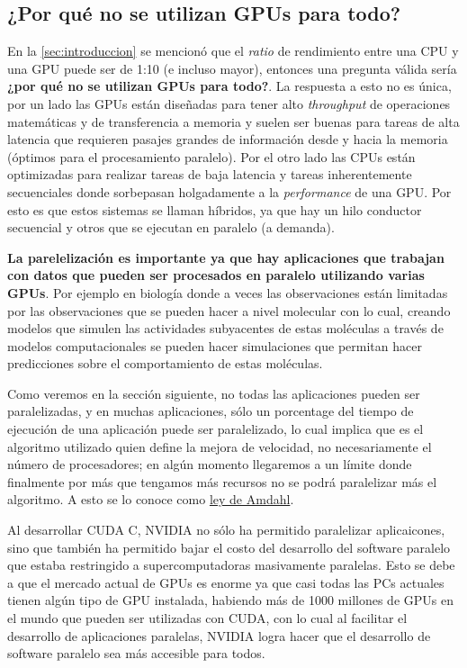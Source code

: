\subsection{¿Por qué no se utilizan GPUs para todo?}

En la \ref{sec:introduccion} se mencionó que el \textit{ratio} de rendimiento entre una CPU y una GPU puede ser de 1:10
(e incluso mayor), entonces una pregunta válida sería \textbf{¿por qué no se utilizan GPUs para todo?}. La respuesta a
esto no es única, por un lado las GPUs están diseñadas para tener alto \textit{throughput} de operaciones matemáticas y
de transferencia a memoria y suelen ser buenas para tareas de alta latencia que requieren pasajes grandes de información
desde y hacia la memoria (óptimos para el procesamiento paralelo). Por el otro lado las CPUs están optimizadas para
realizar tareas de baja latencia y tareas inherentemente secuenciales donde sorbepasan holgadamente a la
\textit{performance} de una GPU. Por esto es que estos sistemas se llaman híbridos, ya que hay un hilo conductor
secuencial y otros que se ejecutan en paralelo (a demanda).

\textbf{La parelelización es importante ya que hay aplicaciones que trabajan con datos que pueden ser procesados en
paralelo utilizando varias GPUs}. Por ejemplo en biología donde a veces las observaciones están limitadas por las
observaciones que se pueden hacer a nivel molecular con lo cual, creando modelos que simulen las actividades subyacentes
de estas moléculas a través de modelos computacionales se pueden hacer simulaciones que permitan hacer predicciones
sobre el comportamiento de estas moléculas.

Como veremos en la sección siguiente, no todas las aplicaciones pueden ser paralelizadas, y en muchas aplicaciones, sólo
un porcentage del tiempo de ejecución de una aplicación puede ser paralelizado, lo cual implica que es el algoritmo
utilizado quien define la mejora de velocidad, no necesariamente el número de procesadores; en algún momento llegaremos
a un límite donde finalmente por más que tengamos más recursos no se podrá paralelizar más el algoritmo. A esto se lo
conoce como \href{https://es.wikipedia.org/wiki/Ley_de_Amdahl}{ley de Amdahl}.

Al desarrollar CUDA C, NVIDIA no sólo ha permitido paralelizar aplicaicones, sino que también ha permitido bajar el
costo del desarrollo del software paralelo que estaba restringido a supercomputadoras masivamente paralelas. Esto se
debe a que el mercado actual de GPUs es enorme ya que casi todas las PCs actuales tienen algún tipo de GPU instalada,
habiendo más de 1000 millones de GPUs en el mundo que pueden ser utilizadas con CUDA, con lo cual al facilitar el
desarrollo de aplicaciones paralelas, NVIDIA logra hacer que el desarrollo de software paralelo sea más accesible para
todos.


